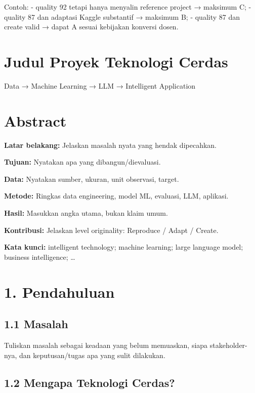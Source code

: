 \documentclass[
  indonesian,
  letterpaper,
  DIV=11,
  numbers=noendperiod]{scrreprt}
\begin{document}
Contoh: - quality 92 tetapi hanya menyalin reference project → maksimum
C; - quality 87 dan adaptasi Kaggle substantif → maksimum B; - quality
87 dan create valid → dapat A sesuai kebijakan konversi dosen.

\chapter{Judul Proyek Teknologi
Cerdas}\label{judul-proyek-teknologi-cerdas}

Data → Machine Learning → LLM → Intelligent Application

\hfill\break

\chapter*{Abstract}\label{abstract}


\textbf{Latar belakang:} Jelaskan masalah nyata yang hendak dipecahkan.

\textbf{Tujuan:} Nyatakan apa yang dibangun/dievaluasi.

\textbf{Data:} Nyatakan sumber, ukuran, unit observasi, target.

\textbf{Metode:} Ringkas data engineering, model ML, evaluasi, LLM,
aplikasi.

\textbf{Hasil:} Masukkan angka utama, bukan klaim umum.

\textbf{Kontribusi:} Jelaskan level originality: Reproduce / Adapt /
Create.

\textbf{Kata kunci:} intelligent technology; machine learning; large
language model; business intelligence; \ldots{}

\chapter{1. Pendahuluan}\label{pendahuluan}

\section{1.1 Masalah}\label{masalah}

Tuliskan masalah sebagai keadaan yang belum memuaskan, siapa
stakeholder-nya, dan keputusan/tugas apa yang sulit dilakukan.

\section{1.2 Mengapa Teknologi Cerdas?}\label{mengapa-teknologi-cerdas}
\end{document}

